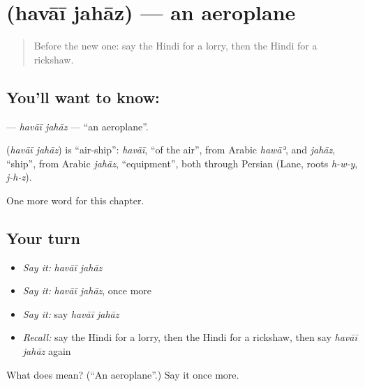 \section[\texorpdfstring{\hi{हवाई} \hi{जहाज़} (havāī jahāz)}{हवाई जहाज़ (havāī jahāz)}]{  (havāī jahāz) — an aeroplane}

\label{lesson:HI-C204-havaijahaz}



\begin{quote}
Before the new one: say the Hindi for a lorry, then the Hindi for a rickshaw.
\end{quote}

\subsection*{You'll want to know:  }
\textbf{ } — \emph{havāī jahāz} — \textquotedblleft{}an aeroplane\textquotedblright{}.

\begin{cousinweb}
\textbf{ } (\emph{havāī jahāz}) is \textquotedblleft{}air-ship\textquotedblright{}: \emph{havāī}, \textquotedblleft{}of the air\textquotedblright{}, from Arabic \emph{hawāʾ}, and \emph{jahāz}, \textquotedblleft{}ship\textquotedblright{}, from Arabic \emph{jahāz}, \textquotedblleft{}equipment\textquotedblright{}, both through Persian (Lane, roots \emph{h-w-y}, \emph{j-h-z}).
\end{cousinweb}

\begin{grammarlens}[title={What you've built}]
One more word for this chapter.
\end{grammarlens}

\subsection*{Your turn}
\begin{itemize}
\raggedright
  \item \emph{Say it:} \emph{havāī jahāz}
  \item \emph{Say it:} \emph{havāī jahāz}, once more
  \item \emph{Say it:} say \emph{havāī jahāz}
  \item \emph{Recall:} say the Hindi for a lorry, then the Hindi for a rickshaw, then say \emph{havāī jahāz} again
\end{itemize}

\begin{tcolorbox}[breakable,colback=teal!4,colframe=teal!35!black,title={Before you move on}]
What does   mean? (\textquotedblleft{}An aeroplane\textquotedblright{}.) Say it once more.
\end{tcolorbox}
